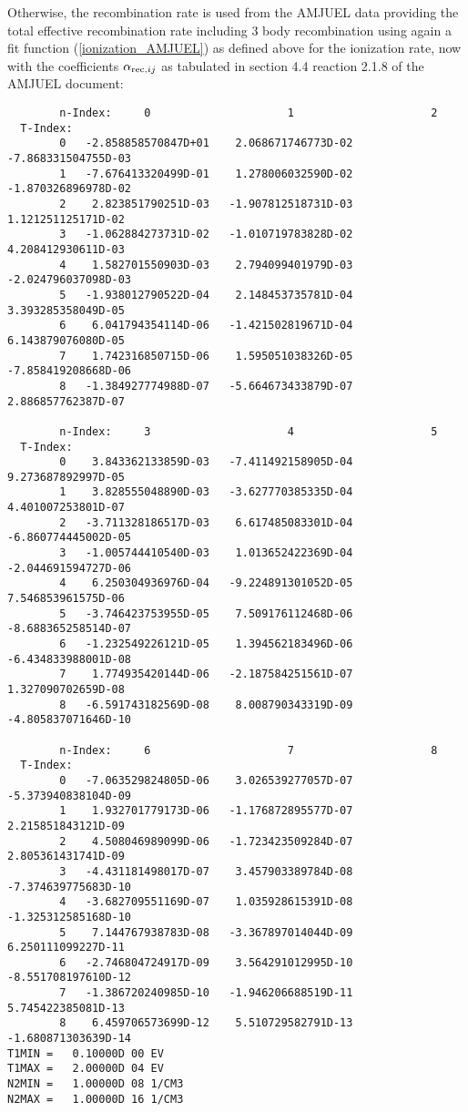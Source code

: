 \documentclass[amsmath,amssymb,a4]{revtex4}
\begin{document}
Otherwise, the recombination rate is used from the AMJUEL data providing the total effective recombination rate including 3 body recombination using again a fit function (\ref{ionization_AMJUEL}) as defined above for the ionization rate, now with the coefficients $\alpha_{{\rm rec,} ij}$ as tabulated in section 4.4 reaction 2.1.8 of the AMJUEL document:
\begin{small}\begin{verbatim}
        n-Index:     0                     1                     2
  T-Index:
        0   -2.858858570847D+01    2.068671746773D-02   -7.868331504755D-03
        1   -7.676413320499D-01    1.278006032590D-02   -1.870326896978D-02
        2    2.823851790251D-03   -1.907812518731D-03    1.121251125171D-02
        3   -1.062884273731D-02   -1.010719783828D-02    4.208412930611D-03
        4    1.582701550903D-03    2.794099401979D-03   -2.024796037098D-03
        5   -1.938012790522D-04    2.148453735781D-04    3.393285358049D-05
        6    6.041794354114D-06   -1.421502819671D-04    6.143879076080D-05
        7    1.742316850715D-06    1.595051038326D-05   -7.858419208668D-06
        8   -1.384927774988D-07   -5.664673433879D-07    2.886857762387D-07

        n-Index:     3                     4                     5
  T-Index:
        0    3.843362133859D-03   -7.411492158905D-04    9.273687892997D-05
        1    3.828555048890D-03   -3.627770385335D-04    4.401007253801D-07
        2   -3.711328186517D-03    6.617485083301D-04   -6.860774445002D-05
        3   -1.005744410540D-03    1.013652422369D-04   -2.044691594727D-06
        4    6.250304936976D-04   -9.224891301052D-05    7.546853961575D-06
        5   -3.746423753955D-05    7.509176112468D-06   -8.688365258514D-07
        6   -1.232549226121D-05    1.394562183496D-06   -6.434833988001D-08
        7    1.774935420144D-06   -2.187584251561D-07    1.327090702659D-08
        8   -6.591743182569D-08    8.008790343319D-09   -4.805837071646D-10

        n-Index:     6                     7                     8
  T-Index:
        0   -7.063529824805D-06    3.026539277057D-07   -5.373940838104D-09
        1    1.932701779173D-06   -1.176872895577D-07    2.215851843121D-09
        2    4.508046989099D-06   -1.723423509284D-07    2.805361431741D-09
        3   -4.431181498017D-07    3.457903389784D-08   -7.374639775683D-10
        4   -3.682709551169D-07    1.035928615391D-08   -1.325312585168D-10
        5    7.144767938783D-08   -3.367897014044D-09    6.250111099227D-11
        6   -2.746804724917D-09    3.564291012995D-10   -8.551708197610D-12
        7   -1.386720240985D-10   -1.946206688519D-11    5.745422385081D-13
        8    6.459706573699D-12    5.510729582791D-13   -1.680871303639D-14
T1MIN =   0.10000D 00 EV
T1MAX =   2.00000D 04 EV
N2MIN =   1.00000D 08 1/CM3
N2MAX =   1.00000D 16 1/CM3
\end{verbatim}\end{small}
\end{document}
